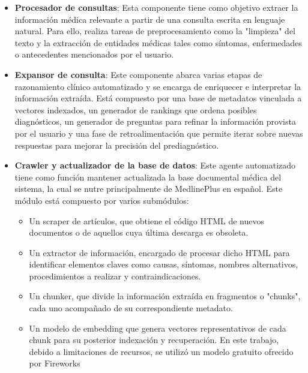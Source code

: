 \documentclass{llncs}
\begin{document}
\begin{itemize}
  \item \textbf{Procesador de consultas}: Esta componente tiene como objetivo extraer la información médica relevante a partir de una consulta escrita en lenguaje natural. Para ello, realiza tareas de preprocesamiento como la "limpieza" del texto y la
  extracción de entidades médicas tales como síntomas, enfermedades o antecedentes mencionados por el usuario.
  \item \textbf{Expansor de consulta}: Este componente abarca varias etapas de razonamiento clínico automatizado y se encarga de enriquecer e interpretar la información extraída. Está compuesto por una base de metadatos vinculada a vectores indexados, un
  generador de rankings que ordena posibles diagnósticos, un generador de preguntas para refinar la información provista por el usuario y una fase de retroalimentación que permite iterar sobre nuevas respuestas para mejorar la precisión del prediagnóstico.
  \item \textbf{Crawler y actualizador de la base de datos}: Este agente automatizado tiene como función mantener actualizada la base documental médica del sistema, la cual se nutre principalmente de MedlinePlus\cite{medlineplus} en español. Este módulo está compuesto
  por varios submódulos:
  \begin{itemize}
    \item Un scraper de artículos, que obtiene el código HTML de nuevos documentos o de aquellos cuya última descarga es obsoleta.
    \item Un extractor de información, encargado de procesar dicho HTML para identificar elementos claves como causas, síntomas, nombres alternativos, procedimientos a realizar y contraindicaciones.
    \item Un chunker, que divide la información extraída en fragmentos o "chunks", cada uno acompañado de su correspondiente metadato.
    \item Un modelo de embedding que genera vectores representativos de cada chunk para su posterior indexación y recuperación. En este trabajo, debido a limitaciones de recursos, se utilizó un modelo gratuito ofrecido por Fireworks\cite{fireworks_ai}
  \end{itemize}

\end{itemize}
\end{document}

